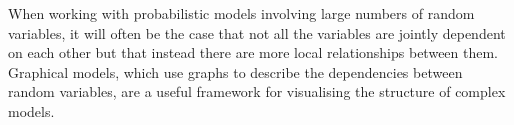When working with probabilistic models involving large numbers of random variables, it will often be the case that not all the variables are jointly dependent on each other but that instead there are more local  relationships between them. Graphical models, which use graphs to describe the dependencies between random variables, are a useful framework for visualising the structure of complex models.

